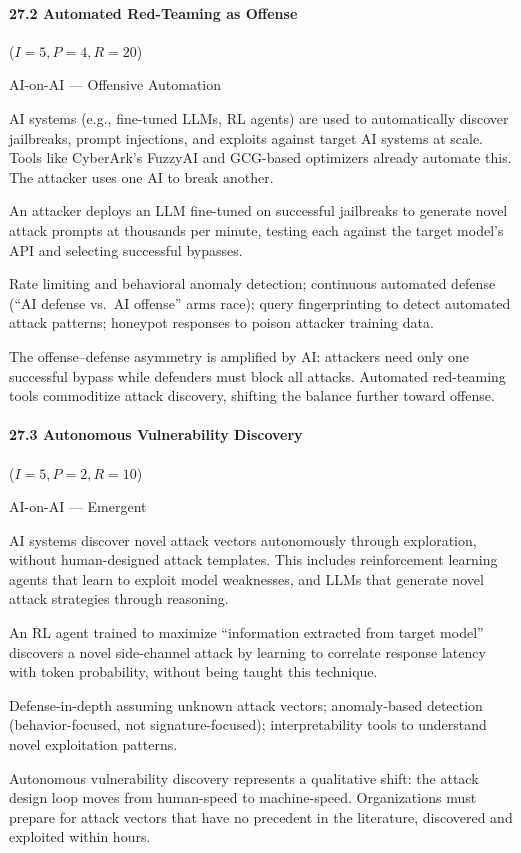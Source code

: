 \documentclass[conference]{IEEEtran}
\newenvironment{attackentry}{\begin{description}[style=unboxed,leftmargin=0cm,itemsep=1pt,parsep=1pt,topsep=2pt,font=\sffamily\small\color{accentdark}]}{\end{description}}
\begin{document}
\paragraph{27.2 Automated Red-Teaming as Offense} ($I{=}5, P{=}4, R{=}20$)
\begin{attackentry}
\item[Category:] AI-on-AI --- Offensive Automation
\item[How it works:] AI systems (e.g., fine-tuned LLMs, RL agents) are used to automatically discover jailbreaks, prompt injections, and exploits against target AI systems at scale. Tools like CyberArk's FuzzyAI \cite{cyberark2025} and GCG-based optimizers already automate this. The attacker uses one AI to break another.
\item[Example:] An attacker deploys an LLM fine-tuned on successful jailbreaks to generate novel attack prompts at thousands per minute, testing each against the target model's API and selecting successful bypasses.
\item[Mitigations:] Rate limiting and behavioral anomaly detection; continuous automated defense (``AI defense vs.\ AI offense'' arms race); query fingerprinting to detect automated attack patterns; honeypot responses to poison attacker training data.
\item[Novel Inference (Observed):] The offense--defense asymmetry is amplified by AI: attackers need only one successful bypass while defenders must block all attacks. Automated red-teaming tools commoditize attack discovery, shifting the balance further toward offense.
\end{attackentry}

\paragraph{27.3 Autonomous Vulnerability Discovery} ($I{=}5, P{=}2, R{=}10$)
\begin{attackentry}
\item[Category:] AI-on-AI --- Emergent
\item[How it works:] AI systems discover novel attack vectors autonomously through exploration, without human-designed attack templates. This includes reinforcement learning agents that learn to exploit model weaknesses, and LLMs that generate novel attack strategies through reasoning.
\item[Example:] An RL agent trained to maximize ``information extracted from target model'' discovers a novel side-channel attack by learning to correlate response latency with token probability, without being taught this technique.
\item[Mitigations:] Defense-in-depth assuming unknown attack vectors; anomaly-based detection (behavior-focused, not signature-focused); interpretability tools to understand novel exploitation patterns.
\item[Novel Inference (Hypothesized):] Autonomous vulnerability discovery represents a qualitative shift: the attack design loop moves from human-speed to machine-speed. Organizations must prepare for attack vectors that have no precedent in the literature, discovered and exploited within hours.
\end{attackentry}
\end{document}
